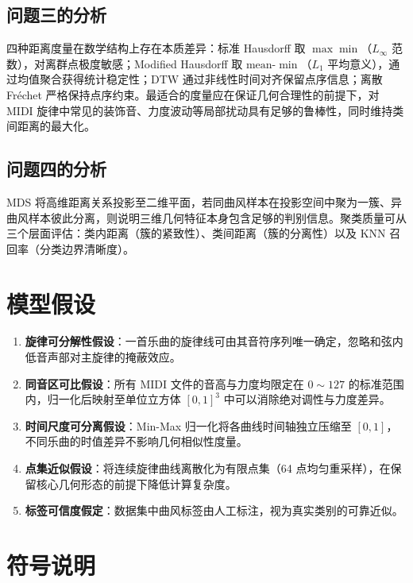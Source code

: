 \documentclass[withoutpreface]{cumcmthesis}
\begin{document}
\subsection{问题三的分析}

四种距离度量在数学结构上存在本质差异：标准 Hausdorff 取 $\max\min$（$L_\infty$ 范数），对离群点极度敏感；Modified Hausdorff 取 $\mathrm{mean}$-$\min$（$L_1$ 平均意义），通过均值聚合获得统计稳定性；DTW 通过非线性时间对齐保留点序信息；离散 Fr\'{e}chet 严格保持点序约束。最适合的度量应在保证几何合理性的前提下，对 MIDI 旋律中常见的装饰音、力度波动等局部扰动具有足够的鲁棒性，同时维持类间距离的最大化。

\subsection{问题四的分析}

MDS 将高维距离关系投影至二维平面，若同曲风样本在投影空间中聚为一簇、异曲风样本彼此分离，则说明三维几何特征本身包含足够的判别信息。聚类质量可从三个层面评估：类内距离（簇的紧致性）、类间距离（簇的分离性）以及 KNN 召回率（分类边界清晰度）。

\section{模型假设}

\begin{enumerate}[label=(\arabic*),leftmargin=2em]
    \item \textbf{旋律可分解性假设}：一首乐曲的旋律线可由其音符序列唯一确定，忽略和弦内低音声部对主旋律的掩蔽效应。
    \item \textbf{同音区可比假设}：所有 MIDI 文件的音高与力度均限定在 $0 \sim 127$ 的标准范围内，归一化后映射至单位立方体 $[0,1]^3$ 中可以消除绝对调性与力度差异。
    \item \textbf{时间尺度可分离假设}：Min-Max 归一化将各曲线时间轴独立压缩至 $[0,1]$，不同乐曲的时值差异不影响几何相似性度量。
    \item \textbf{点集近似假设}：将连续旋律曲线离散化为有限点集（64 点均匀重采样），在保留核心几何形态的前提下降低计算复杂度。
    \item \textbf{标签可信度假定}：数据集中曲风标签由人工标注，视为真实类别的可靠近似。
\end{enumerate}

\section{符号说明}
\end{document}
